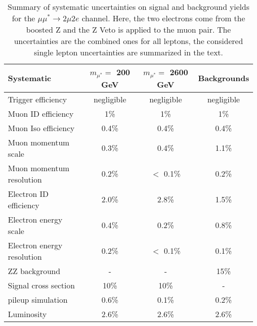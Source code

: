 \begin{table}[h!]
\begin{center}
\begin{tabular}{lccc}
\hline
Systematic & $m_{\mu^{*}} =$ 200 GeV & $m_{\mu^{*}} =$ 2600 GeV & Backgrounds \\
\hline
Trigger efficiency & negligible & negligible & negligible \\
Muon ID efficiency & 1\% & 1\% & 1\% \\
Muon Iso efficiency & 0.4\% & 0.4\% & 0.4\% \\
Muon momentum scale & 0.3\% & 0.4\% & 1.1\% \\
Muon momentum resolution & 0.2\% & $<$ 0.1\% &  0.2\% \\
Electron ID efficiency & 2.0\% & 2.8\% & 1.5\% \\
Electron energy scale & 0.4\% & 0.2\% & 0.8\% \\
Electron energy resolution & 0.2\% & $<$ 0.1\% & 0.1\% \\
ZZ background & - & - & 15\% \\
Signal cross section & 10\% & 10\% & - \\
pileup simulation & 0.6\% & 0.1\% & 0.2\% \\
Luminosity & 2.6\% & 2.6\% & 2.6\% \\
\hline

\end{tabular}
\end{center}
\caption{\label{tab:uncertainties1}Summary of systematic uncertainties on signal and background yields for the $\mu\mu^{*}\rightarrow 2\mu 2e$ channel. Here, the two electrons come from the boosted Z and the Z Veto is applied to the muon pair. The uncertainties are the combined ones for all leptons, the considered single lepton uncertainties are summarized in the text.}
\end{table}


